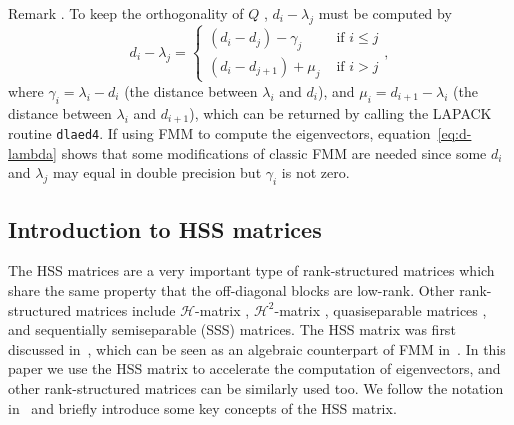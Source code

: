 \documentclass[times]{nlaauth}
\newcounter{remark}
\newenvironment{remark}{\refstepcounter{remark}\vspace{1ex}
{\sc Remark \theremark.}\hspace{0.3em}\parindent=0pt}{\vspace{1ex}}
\begin{document}
\begin{remark}
To keep the orthogonality of $Q$ , $d_i-\lambda_j$ must be computed by
\begin{equation}
  \label{eq:d-lambda}
  d_i - \lambda_j =
\begin{cases}
(d_i-d_j)-\gamma_j & \text{ if } i\le j  \\
(d_i -d_{j+1})+\mu_j & \text{ if } i > j
\end{cases},
\end{equation}
where $\gamma_i=\lambda_i-d_i$ (the distance between $\lambda_i$ and $d_i$),
and $\mu_i=d_{i+1}-\lambda_i$ (the distance between $\lambda_i$ and $d_{i+1}$),
which can be returned by calling the LAPACK routine \texttt{dlaed4}.
If using FMM to compute the eigenvectors, equation~\eqref{eq:d-lambda} shows that some modifications of classic FMM are needed
since some $d_i$ and $\lambda_j$ may equal in double precision but
$\gamma_i$ is not zero.

\end{remark}

\subsection{Introduction to HSS matrices}
\label{sec:hss}

The HSS matrices are a very important type of rank-structured matrices
which share the same property that the off-diagonal blocks are low-rank.
Other rank-structured matrices include  $\mathcal{H}$-matrix \cite{Hackbusch1999,Hackbusch2000},
$\mathcal{H}^{2}$-matrix \cite{Hackbusch-Sauter2000,Hackbusch-Borm2002},
quasiseparable matrices \cite{Eidelman-Gohberg1999, Vandebril-book1}, and sequentially
semiseparable (SSS) \cite{Chandrasekaran03,ChandrasekaranGu05} matrices.
The HSS matrix was first discussed in~\cite{ChandrasekaranGu04,Hss-ulv}, which can be seen as
an algebraic counterpart of FMM in~\cite{Starr-thesis}.
In this paper we use the HSS matrix to accelerate the computation of eigenvectors,
and other rank-structured matrices can be similarly used too.
We follow the notation in~\cite{Xia-Fast09,Xia-HSS-Chol} and briefly introduce some key concepts of
the HSS matrix.
\end{document}
